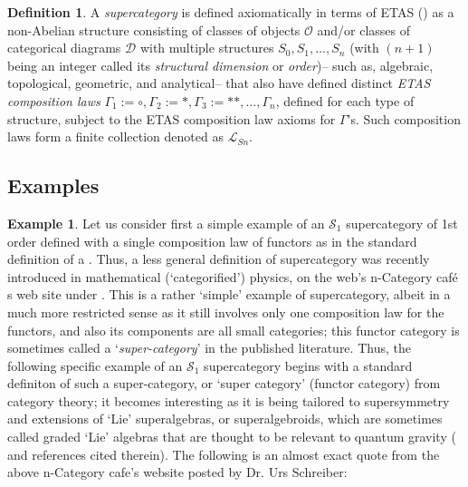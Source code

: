 \documentclass[12pt]{article}
\theoremstyle{plain}
\theoremstyle{definition}
\newtheorem{definition}{Definition}[section]
\newtheorem{example}{Example}[section]
\numberwithin{equation}{section}
\begin{document}
\begin{definition} 
A \emph{supercategory} is defined axiomatically in terms of ETAS (\cite{ICB3}) as a non-Abelian structure consisting of classes of objects $\mathcal{O}$ and/or classes of categorical diagrams $\mathcal{D}$ with multiple structures $S_0, S_1, ..., S_n$ (with $(n+1)$ being an integer called its \emph{structural dimension} or \emph{order})-- such as, algebraic, topological, geometric, and analytical-- that also have defined distinct \emph{ETAS composition laws} $\Gamma_1 := \circ, \Gamma_2 := *, \Gamma_3:= **, ...,\Gamma_n$, defined for each type of structure, subject to the ETAS composition law axioms for $\Gamma$'s. Such composition laws form a finite collection denoted as 
$\mathcal{L}_{Sn}$.
\end{definition}

\subsection{Examples}

\begin{example}

Let us consider first a simple example of an $\mathcal{S}_1$ supercategory of 1st order defined with a single composition law of functors as in the standard definition of a . Thus, a less general definition of supercategory was recently introduced in mathematical (`categorified') physics, on the web's n-Category caf\'e s web site under . This is a rather `simple' example of supercategory, albeit in a much more restricted sense as it still involves only one composition law for
the functors, and also its components are all small categories; this functor category is sometimes called a 
`\emph{super-category}' in the published literature. Thus, the following specific example of an $\mathcal{S}_1$ supercategory begins with a standard definiton of such a super-category, or `super category' (functor category) from category theory; it becomes interesting as it is being tailored to supersymmetry and extensions of `Lie' superalgebras, or superalgebroids, which are sometimes called graded `Lie' algebras that are thought to be relevant to quantum gravity (\cite{BGB2} and references cited therein). The following is an almost exact quote from the above n-Category cafe's website posted by Dr. Urs Schreiber: 
\end{example}
\end{document}
